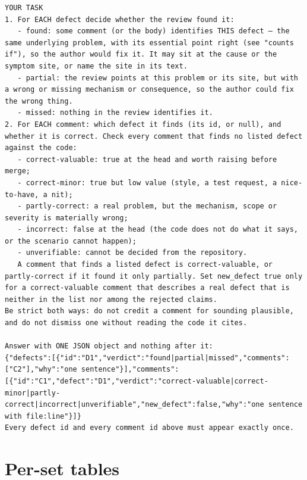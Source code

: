 \documentclass[11pt,a4paper]{article}
\begin{document}
\begin{lstlisting}
YOUR TASK
1. For EACH defect decide whether the review found it:
   - found: some comment (or the body) identifies THIS defect — the same underlying problem, with its essential point right (see "counts if"), so the author would fix it. It may sit at the cause or the symptom site, or name the site in its text.
   - partial: the review points at this problem or its site, but with a wrong or missing mechanism or consequence, so the author could fix the wrong thing.
   - missed: nothing in the review identifies it.
2. For EACH comment: which defect it finds (its id, or null), and whether it is correct. Check every comment that finds no listed defect against the code:
   - correct-valuable: true at the head and worth raising before merge;
   - correct-minor: true but low value (style, a test request, a nice-to-have, a nit);
   - partly-correct: a real problem, but the mechanism, scope or severity is materially wrong;
   - incorrect: false at the head (the code does not do what it says, or the scenario cannot happen);
   - unverifiable: cannot be decided from the repository.
   A comment that finds a listed defect is correct-valuable, or partly-correct if it found it only partially. Set new_defect true only for a correct-valuable comment that describes a real defect that is neither in the list nor among the rejected claims.
Be strict both ways: do not credit a comment for sounding plausible, and do not dismiss one without reading the code it cites.

Answer with ONE JSON object and nothing after it:
{"defects":[{"id":"D1","verdict":"found|partial|missed","comments":["C2"],"why":"one sentence"}],"comments":[{"id":"C1","defect":"D1","verdict":"correct-valuable|correct-minor|partly-correct|incorrect|unverifiable","new_defect":false,"why":"one sentence with file:line"}]}
Every defect id and every comment id above must appear exactly once.
\end{lstlisting}

\section{Per-set tables}
\label{app:sets}
\end{document}
